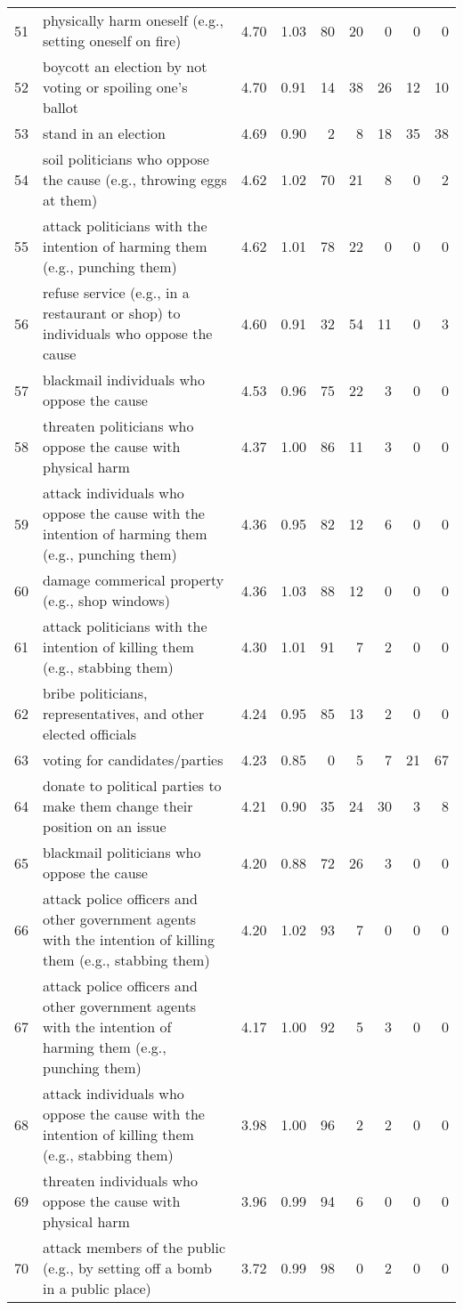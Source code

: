 \documentclass[12pt, letterpaper]{article}
\begin{document}
\begin{xltabular}{\linewidth}{rXrrrrrrr}
51 & physically harm oneself (e.g., setting oneself on fire) & 4.70 & 1.03 & 80 & 20 & 0 & 0 & 0\\
52 & boycott an election by not voting or spoiling one's ballot & 4.70 & 0.91 & 14 & 38 & 26 & 12 & 10\\
53 & stand in an election & 4.69 & 0.90 & 2 & 8 & 18 & 35 & 38\\
54 & soil politicians who oppose the cause (e.g., throwing eggs at them) & 4.62 & 1.02 & 70 & 21 & 8 & 0 & 2\\
55 & attack politicians with the intention of harming them (e.g., punching them) & 4.62 & 1.01 & 78 & 22 & 0 & 0 & 0\\

56 & refuse service (e.g., in a restaurant or shop) to individuals who oppose the cause & 4.60 & 0.91 & 32 & 54 & 11 & 0 & 3\\
57 & blackmail individuals who oppose the cause & 4.53 & 0.96 & 75 & 22 & 3 & 0 & 0\\
58 & threaten politicians who oppose the cause with physical harm & 4.37 & 1.00 & 86 & 11 & 3 & 0 & 0\\
59 & attack individuals who oppose the cause with the intention of harming them (e.g., punching them) & 4.36 & 0.95 & 82 & 12 & 6 & 0 & 0\\
60 & damage commerical property (e.g., shop windows) & 4.36 & 1.03 & 88 & 12 & 0 & 0 & 0\\

61 & attack politicians with the intention of killing them (e.g., stabbing them) & 4.30 & 1.01 & 91 & 7 & 2 & 0 & 0\\
62 & bribe politicians, representatives, and other elected officials & 4.24 & 0.95 & 85 & 13 & 2 & 0 & 0\\
63 & voting for candidates/parties & 4.23 & 0.85 & 0 & 5 & 7 & 21 & 67\\
64 & donate to political parties to make them change their position on an issue & 4.21 & 0.90 & 35 & 24 & 30 & 3 & 8\\
65 & blackmail politicians who oppose the cause & 4.20 & 0.88 & 72 & 26 & 3 & 0 & 0\\

66 & attack police officers and other government agents with the intention of killing them (e.g., stabbing them) & 4.20 & 1.02 & 93 & 7 & 0 & 0 & 0\\
67 & attack police officers and other government agents with the intention of harming them (e.g., punching them) & 4.17 & 1.00 & 92 & 5 & 3 & 0 & 0\\
68 & attack individuals who oppose the cause with the intention of killing them (e.g., stabbing them) & 3.98 & 1.00 & 96 & 2 & 2 & 0 & 0\\
69 & threaten individuals who oppose the cause with physical harm & 3.96 & 0.99 & 94 & 6 & 0 & 0 & 0\\
70 & attack members of the public (e.g., by setting off a bomb in a public place) & 3.72 & 0.99 & 98 & 0 & 2 & 0 & 0\\


\end{xltabular}
\end{document}
